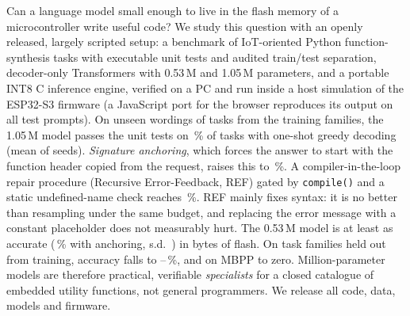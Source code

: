 Can a language model small enough to live in the flash memory of a microcontroller write useful code? We study this question with an openly released, largely scripted setup: a benchmark of IoT-oriented Python function-synthesis tasks with executable unit tests and audited train/test separation, decoder-only Transformers with 0.53\,M and 1.05\,M parameters, and a portable INT8 C inference engine, verified on a PC and run inside a host simulation of the ESP32-S3 firmware (a JavaScript port for the browser reproduces its output on all test prompts). On unseen wordings of tasks from the training families, the 1.05\,M model passes the unit tests on \testidgreedypass\,\% of tasks with one-shot greedy decoding (mean of \nseeds{} seeds). \emph{Signature anchoring}, which forces the answer to start with the function header copied from the request, raises this to \testidanchorpass\,\%. A compiler-in-the-loop repair procedure (Recursive Error-Feedback, REF) gated by \texttt{compile()} and a static undefined-name check reaches \testidareflintpass\,\%. REF mainly fixes syntax: it is no better than resampling under the same budget, and replacing the error message with a constant placeholder does not measurably hurt. The 0.53\,M model is at least as accurate (\seedsSmalltestidanchor\,\% with anchoring, s.d.\ \seedsSmalltestidanchorsd) in \dsmflashtotalbytes{} bytes of flash. On task families held out from training, accuracy falls to \testoodgreedypass--\seedsSmalltestoodareflint\,\%, and on MBPP to zero. Million-parameter models are therefore practical, verifiable \emph{specialists} for a closed catalogue of embedded utility functions, not general programmers. We release all code, data, models and firmware.
